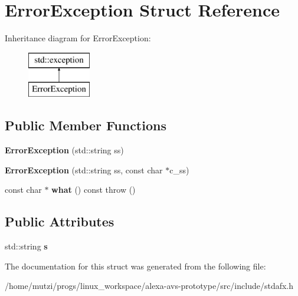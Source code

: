 \hypertarget{structErrorException}{}\section{Error\+Exception Struct Reference}
\label{structErrorException}
Inheritance diagram for Error\+Exception\+:\begin{figure}[H]
\begin{center}
\leavevmode
\includegraphics[height=2.000000cm]{df/d85/structErrorException}
\end{center}
\end{figure}
\subsection*{Public Member Functions}
\begin{DoxyCompactItemize}
\item 
\mbox{\label{structErrorException_a6de4ce56ef8944558d91c6d3d229620e}} 
{\bfseries Error\+Exception} (std\+::string ss)
\item 
\mbox{\label{structErrorException_a9cee101d4140d24592c243496110a1b2}} 
{\bfseries Error\+Exception} (std\+::string ss, const char $\ast$c\+\_\+ss)
\item 
\mbox{\label{structErrorException_a2f53b316b322c7a5b6361de7179f8a3b}} 
const char $\ast$ {\bfseries what} () const  throw ()
\end{DoxyCompactItemize}
\subsection*{Public Attributes}
\begin{DoxyCompactItemize}
\item 
\mbox{\label{structErrorException_ad24d7aec3e1e273c8c9e18e3d4ca0571}} 
std\+::string {\bfseries s}
\end{DoxyCompactItemize}


The documentation for this struct was generated from the following file\+:\begin{DoxyCompactItemize}
\item 
/home/mutzi/progs/linux\+\_\+workspace/alexa-\/avs-\/prototype/src/include/stdafx.\+h\end{DoxyCompactItemize}
